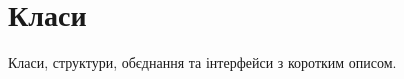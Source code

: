 \section{Класи}
Класи, структури, об\textquotesingle{}єднання та інтерфейси з коротким описом.\begin{DoxyCompactList}
\item{}
\end{DoxyCompactList}
